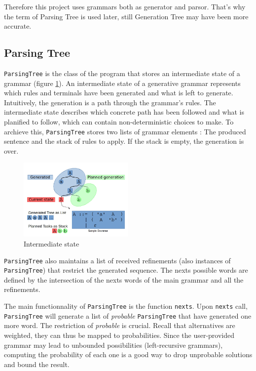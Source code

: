 \documentclass[twocolumn, 11pt]{article}
\newcommand{\code}[1]{\lstinline[language=Scala,columns=fixed,basicstyle=\ttfamily]|#1|}
\begin{document}
Therefore this project uses grammars both as generator and parsor. That's why the term of Parsing Tree is used later, still Generation Tree may have been more accurate.

\subsection{Parsing Tree}


\code{ParsingTree} is the class of the program that stores an intermediate state of a grammar (figure \ref{fig:PT}). An intermediate state of a generative grammar represents which rules and terminals have been generated and what is left to generate. Intuitively, the generation is a path through the grammar's rules. The intermediate state describes which concrete path has been followed and what is planified to follow, which can contain non-deterministic choices to make.
To archieve this, \code{ParsingTree} stores two lists of grammar elements : The produced sentence and the stack of rules to apply. If the stack is empty, the generation is over.

\begin{figure}[h]
  \centering
  \includegraphics[width=0.5\textwidth]{parsingTree}
  \caption{Intermediate state}
  \label{fig:PT}
\end{figure}

\code{ParsingTree} also maintains a list of received refinements (also instances of \code{ParsingTree}) that restrict the generated sequence. The nexts possible words are defined by the intersection of the nexts words of the main grammar and all the refinements.

The main functionnality of \code{ParsingTree} is the function \code{nexts}. Upon \code{nexts} call, \code{ParsingTree} will generate a list of \emph{probable} \code{ParsingTree} that have generated one more word. The restriction of \emph{probable} is crucial. Recall that alternatives are weighted, they can thus be mapped to probabilities. Since the user-provided grammar may lead to unbounded possibilities (left-recursive grammars), computing the probability of each one is a good way to drop unprobable solutions and bound the result.
\end{document}
